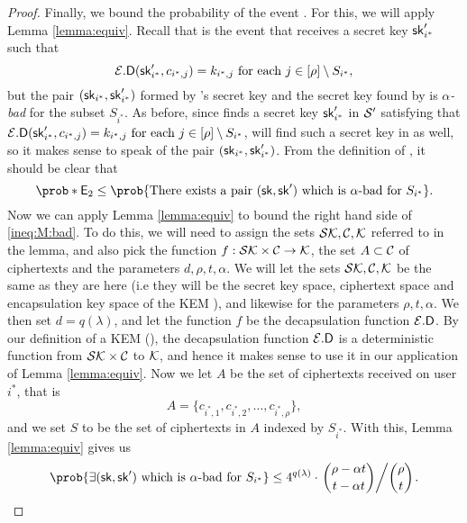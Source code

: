 \begin{proof}
  Finally, we bound the probability of the event .
  For this, we will apply Lemma \ref{lemma:equiv}.
  Recall that  is the event that
  \redM receives a secret key \(\mathsf{sk}_{i^{*}}'\) such that
  \[
  \mathcal{E}.\mathsf{D}(\mathsf{sk}_{i^{*}}',c_{i^{*},j}) = k_{i^{*},j} \text{ for each } j \in [\rho] \setminus S_{i^{*}},
  \]
  but the pair \((\mathsf{sk}_{i^{*}}, \mathsf{sk}_{i^{*}}')\) formed by \redM's secret key and the secret key found by \advA
  is \emph{\(\alpha\)-bad} for the subset \(S_{i^{*}}\).
  As before, since \redM finds a secret key \(\mathsf{sk}_{i^{*}}'\) in \(\mathcal{S}'\) satisfying that
  \(\mathcal{E}.\mathsf{D}(\mathsf{sk}_{i^{*}}',c_{i^{*},j}) = k_{i^{*},j} \text{ for each } j \in [\rho] \setminus S_{i^{*}}\),
  \advA will find such a secret key in \Simple as well, so it makes sense to speak of the pair \((\mathsf{sk}_{i^{*}}, \mathsf{sk}_{i^{*}}')\).
  From the definition of , it should be clear that
  \begin{equation}\label{ineq:M:bad}
    \prob*{\eventi{2}} \le \prob{\text{There exists a pair } (\sk,\sk') \text{ which is \(\alpha\)-bad for } S_{i^{*}}}.
  \end{equation}
  Now we can apply Lemma \ref{lemma:equiv} to bound the right hand side of \eqref{ineq:M:bad}.
  To do this, we will need to assign the sets \(\mathcal{SK}, \mathcal{C}, \mathcal{K}\) referred to in the lemma,
  and also pick the function \(f : \mathcal{SK} \times \mathcal{C} \to \mathcal{K}\),
  the set \(A \subset \mathcal{C}\) of ciphertexts and the parameters \(d,\rho,t,\alpha\).
  We will let the sets \(\mathcal{SK}, \mathcal{C}, \mathcal{K}\)
  be the same as they are here (i.e they will be the secret key space, ciphertext space and encapsulation key space of the KEM \KEM), and likewise for the parameters \(\rho, t, \alpha\).
  We then set \(d = q(\lambda)\),
  and let the function \(f\) be the decapsulation function \(\mathcal{E}.\mathsf{D}\).
  By our definition of a KEM (), the decapsulation function
  \(\mathcal{E}.\mathsf{D}\) is a deterministic function from \(\mathcal{SK} \times \mathcal{C}\) to \(\mathcal{K}\),
  and hence it makes sense to use it in our application of Lemma \ref{lemma:equiv}.
  Now we let \(A\) be the set of ciphertexts received on user \(i^{*}\), that is
  \[
    A = \{c_{i^{*},1},c_{i^{*},2},\ldots,c_{i^{*},\rho}\},
  \]
  and we set \(S\) to be the set of ciphertexts in \(A\) indexed by \(S_{i^{*}}\).
  With this, Lemma \ref{lemma:equiv} gives us
  \[
    \prob{\exists (\sk,\sk') \text{ which is \(\alpha\)-bad for } S_{i^{*}}}
    \le 4^{q(\lambda)} \cdot \left. \binom{\rho - \alpha t}{t - \alpha t} \middle/ \binom{\rho}{t} \right..
  \]


\end{proof}
